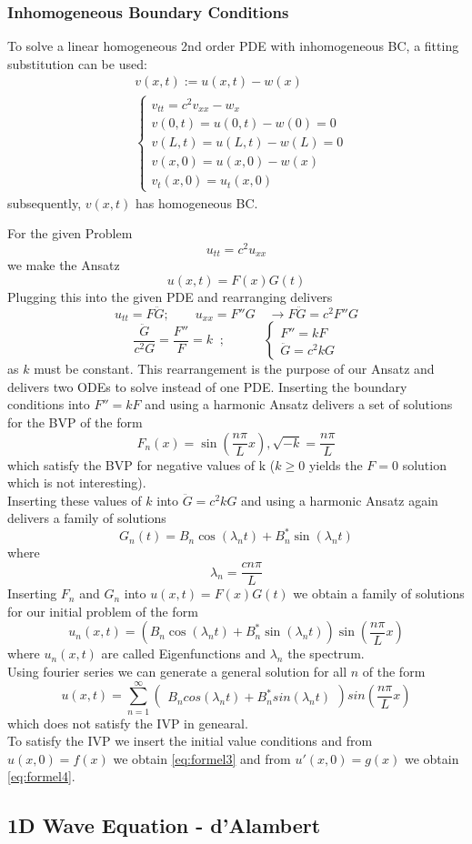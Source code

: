\subsubsection{Inhomogeneous Boundary Conditions}
To solve a linear homogeneous 2nd order PDE with inhomogeneous BC, a fitting substitution can be used:
\begin{align*}
    &v(x,t):= u(x,t) -w(x)\\
    &\begin{cases}
        v_{tt}=c^2v_{xx}-w_x\\
        v(0,t)=u(0,t)-w(0)=0\\
        v(L,t)=u(L,t)-w(L)=0\\
        v(x,0)=u(x,0)-w(x)\\
        v_t(x,0)=u_t(x,0)
    \end{cases}
\end{align*}
subsequently, $v(x,t)$ has homogeneous BC.
%
%
\begin{examplesection}[Example]
For the given Problem
\[ u_{tt}=c^2u_{xx}\]
we make the Ansatz
\[u(x,t)=F(x)G(t)\]
Plugging this into the given PDE and rearranging delivers
\[u_{tt}=F\ddot{G};\qquad u_{xx}=F''G \quad \rightarrow F\ddot{G}=c^2F''G\]
\[\frac{\ddot{G}}{c^2G}=\frac{F''}{F}=k\;\; ;\qquad\quad\begin{cases} F''=kF\\
\ddot{G}=c^2kG
\end{cases}\]
as $k$ must be constant. This rearrangement is the purpose of our Ansatz and delivers two ODEs to solve instead of one PDE.
Inserting the boundary conditions into $F''=kF$ and using a harmonic Ansatz delivers a set of solutions for the BVP of the form
\[F_n (x)=\sin{\left( \frac{n \pi}{L} x \right) }, \sqrt{-k}=\frac{n \pi}{L}\]
which satisfy the BVP for negative values of k ($k \ge 0$ yields the $F=0$ solution which is not interesting).\\
Inserting these values of $k$ into $\ddot{G}=c^2kG$ and using a harmonic Ansatz again delivers a family of solutions
\[G_n (t) =  B_n \cos{(\lambda_{n} t)} + B_n^* \sin{(\lambda_{n}t)}\]
where 
\[ \lambda_{n} = \frac{c n \pi}{L} \] 
Inserting $F_n$ and $G_n$ into $u(x,t)=F(x)G(t)$ we obtain a family of solutions for our initial problem of the form
\[u_n (x, t) = (B_n \cos{(\lambda_{n} t)} + B_n^* \sin{(\lambda_{n}t)})\sin{\left( \frac{n \pi}{L} x \right) } \]
where $u_n (x, t)$ are called Eigenfunctions and $\lambda_n$ the spectrum.\\
Using fourier series we can generate a general solution for all $n$ of the form
\[u(x,t)=\sum\limits_{n=1}^{\infty}\begin{pmatrix}
    B_n cos(\lambda _n t)+B_n^* sin(\lambda_n t)
    \end{pmatrix} sin\left(\frac{n \pi}{L}x \right) \]
which does not satisfy the IVP in genearal.\\
To satisfy the IVP we insert the initial value conditions and from $u(x,0)=f(x)$ we obtain \ref*{eq:formel3} and from $u'(x,0)=g(x)$ we obtain \ref*{eq:formel4}.
\end{examplesection}
\subsection{1D Wave Equation - d'Alambert}